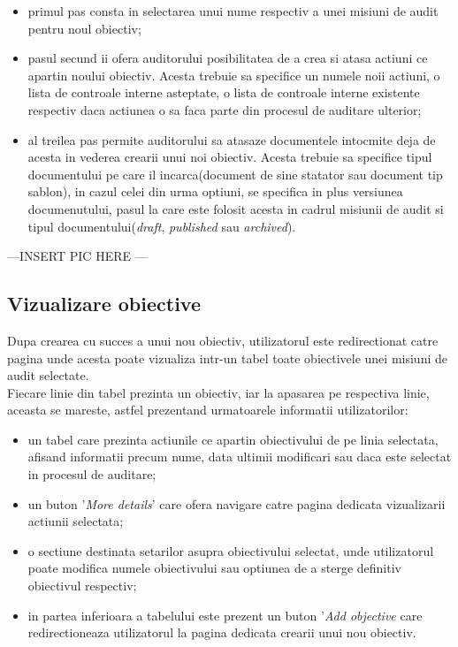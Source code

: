 \begin{itemize}
	\item primul pas consta in selectarea unui nume respectiv a unei misiuni de audit pentru noul obiectiv;
	
	\item pasul secund ii ofera auditorului posibilitatea de a crea si atasa actiuni ce apartin noului obiectiv. Acesta trebuie sa specifice un numele noii actiuni, o lista de controale interne asteptate, o lista de controale interne existente respectiv daca actiunea o sa faca parte din procesul de auditare ulterior;
	
	\item al treilea pas permite  auditorului sa atasaze documentele intocmite deja de acesta in vederea crearii unui noi obiectiv. Acesta trebuie sa specifice tipul documentului pe care il incarca(document de sine statator sau document tip sablon), in cazul celei din urma optiuni, se specifica in plus versiunea documenutului, pasul la care este folosit acesta in cadrul misiunii de audit  si tipul documentului(\textit{draft}, \textit{published} sau \textit{archived}).
\end{itemize}

---INSERT PIC HERE ---\\

\subsection*{Vizualizare obiective}
Dupa crearea cu succes a unui nou obiectiv, utilizatorul este redirectionat catre pagina unde acesta poate vizualiza intr-un tabel toate obiectivele unei misiuni de audit selectate.\\
Fiecare linie din tabel prezinta un obiectiv, iar la apasarea pe respectiva linie, aceasta se mareste, astfel prezentand urmatoarele informatii utilizatorilor:
	\begin{itemize}
	
		\item un tabel care prezinta actiunile ce apartin obiectivului de pe linia selectata, afisand informatii precum nume, data ultimii modificari sau daca este selectat in procesul de auditare;
		
		\item un buton '\textit{More details}' care ofera navigare catre pagina dedicata vizualizarii actiunii selectata;
		
		\item o sectiune destinata setarilor asupra obiectivului selectat, unde utilizatorul poate modifica numele obiectivului sau optiunea de a sterge definitiv obiectivul respectiv;
		
		\item in partea inferioara a tabelului este prezent un buton '\textit{Add objective} care redirectioneaza utilizatorul la pagina dedicata crearii unui nou obiectiv.
		
	
	\end{itemize}

